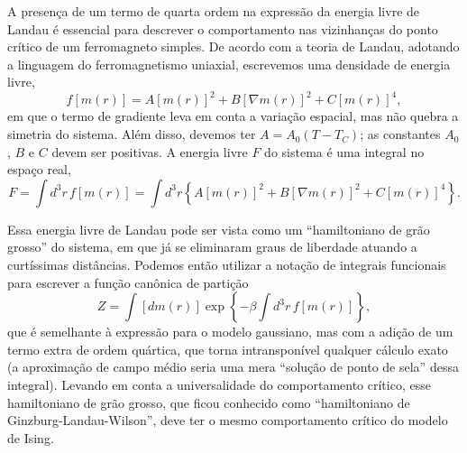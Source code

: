 \documentclass[12pt,a4paper]{article}
\begin{document}
A presença de um termo de quarta ordem na expressão da energia livre
de Landau é essencial para descrever o comportamento nas vizinhanças do
ponto crítico de um ferromagneto simples. De acordo com a teoria de
Landau, adotando a linguagem do ferromagnetismo uniaxial, escrevemos uma
densidade de energia livre,
\[
f\left[m(r)\right]=A\left[m(r)\right]^2+B\left[\nabla m(r)\right]^2+C\left[m(r)\right]^4,
\]
em que o termo de gradiente leva em conta a variação espacial, mas não
quebra a simetria do sistema. Além disso, devemos ter $A=A_0\left(T-T_C\right)$; as
constantes $A_0$, $B$ e $C$ devem ser positivas. A energia livre $F$ do sistema é
uma integral no espaço real,
\begin{equation}
F=\int d^3r\,f\left[m(r)\right]=\int d^3r\left\{A\left[m(r)\right]^2+B\left[\nabla m(r)\right]^2+C\left[m(r)\right]^4\right\}.
\end{equation}

Essa energia livre de Landau pode ser vista como um ``hamiltoniano de
grão grosso'' do sistema, em que já se eliminaram graus de liberdade atuando
a curtíssimas distâncias. Podemos então utilizar a notação de integrais
funcionais para escrever a função canônica de partição
\begin{equation}
Z=\int\left[dm(r)\right]\exp\left\{-\beta\int d^3r\,f\left[m(r)\right]\right\},
\end{equation}
que é semelhante à expressão para o modelo gaussiano, mas com a adição
de um termo extra de ordem quártica, que torna intransponível qualquer
cálculo exato (a aproximação de campo médio seria uma mera ``solução de
ponto de sela'' dessa integral). Levando em conta a universalidade do
comportamento crítico, esse hamiltoniano de grão grosso, que ficou conhecido
como ``hamiltoniano de Ginzburg-Landau-Wilson'', deve ter o mesmo
comportamento crítico do modelo de Ising.
\end{document}
